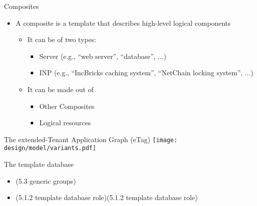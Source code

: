 \begin{frame}{Composites}
    \begin{itemize}
        \item A composite is a template that describes high-level logical components
        \begin{itemize}
            \item It can be of two types:
            \begin{itemize}
                \item Server (e.g., “web server”, “database”, ...)
                \item INP (e.g., “IncBricks caching system”, “NetChain locking system”, ...)
            \end{itemize}
            \item It can be made out of
            \begin{itemize}
                \item Other Composites
                \item Logical resources
            \end{itemize}
        \end{itemize}
    \end{itemize}
\end{frame}

\begin{frame}{The extended-Tenant Application Graph (eTag)}
    \centering
    \texttt{[image: design/model/variants.pdf]}
\end{frame}

\begin{frame}{The template database}
    \begin{itemize}
        \item (5.3 generic groups)
        \item (5.1.2 template database role)(5.1.2 template database role)
    \end{itemize}
\end{frame}

